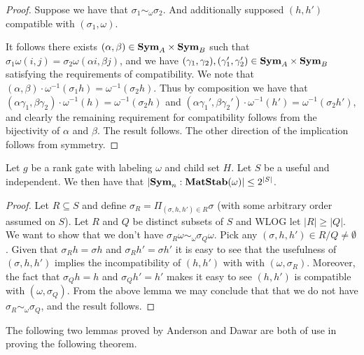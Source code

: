\documentclass[12pt]{report}
\newcommand{\matstab}{\text{\textbf{MatStab}}}
\newcommand{\sym}{\text{\textbf{Sym}}}
\begin{document}
\begin{proof}
  Suppose we have that $\sigma_1 \sim_\omega \sigma_2$. And additionally
  supposed $(h, h')$ compatible with $(\sigma_1, \omega)$.

  It follows there exists $(\alpha, \beta) \in \sym_A \times \sym_B$ such that
  $\sigma_1 \omega (i,j) = \sigma_2\omega (\alpha i, \beta j)$, and we have
  $(\gamma_1, \gamma_2), (\gamma_1', \gamma_2') \in \sym_A \times \sym_B$
  satisfying the requirements of compatibility. We note that $(\alpha, \beta)
  \cdot \omega^{-1}(\sigma_1 h) = \omega^{-1}(\sigma_2 h)$. Thus by composition
  we have that $(\alpha \gamma_1, \beta \gamma_2) \cdot \omega^{-1}(h) =
  \omega^{-1}(\sigma_2 h)$ and $(\alpha \gamma_1', \beta \gamma_2') \cdot
  \omega^{-1}(h') = \omega^{-1}(\sigma_2 h')$, and clearly the remaining
  requirement for compatibility follows from the bijectivity of $\alpha$ and
  $\beta$. The result follows. The other direction of the implication follows
  from symmetry.
\end{proof}

\begin{claim}
  \label{claim:useful-independant-set}
  Let $g$ be a rank gate with labeling $\omega$ and child set $H$. Let $S$ be a
  useful and independent. We then have that $\vert \sym_n: \matstab(\omega)
  \vert \leq 2^{\vert S \vert}$.
\end{claim}

\begin{proof}
  Let $R \subseteq S$ and define $\sigma_R = \Pi_{(\sigma, h, h') \in R} \sigma$
  (with some arbitrary order assumed on $S$). Let $R$ and $Q$ be distinct
  subsets of $S$ and WLOG let $\vert R \vert \geq \vert Q \vert$. We want to
  show that we don't have $\sigma_R \omega \sim_\omega \sigma_Q \omega$. Pick
  any $(\sigma, h, h') \in R/Q \neq \emptyset$. Given that $\sigma_R h = \sigma
  h$ and $\sigma_R h' = \sigma h'$ it is easy to see that the usefulness of
  $(\sigma, h,h')$ implies the incompatibility of $(h,h')$ with with $(\omega,
  \sigma_R)$. Moreover, the fact that $\sigma_Q h = h$ and $\sigma_Q h' = h'$
  makes it easy to see $(h,h')$ is compatible with $(\omega, \sigma_Q)$. From
  the above lemma we may conclude that that we do not have $\sigma_R \sim_\omega
  \sigma_Q$, and the result follows.
\end{proof}

The following two lemmas proved by Anderson and Dawar \cite{AndersonD17} are
both of use in proving the following theorem.
\end{document}
